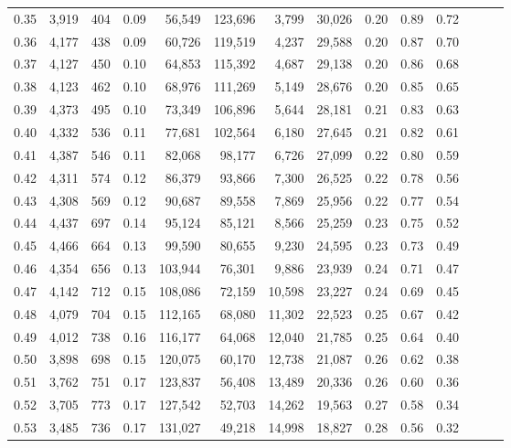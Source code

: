 \begin{tabular}{rrrrrrrrrrrrrr}
0.35 &  3,919 &  404 &  0.09 &   56,549 &  123,696 &   3,799 &  30,026 &  0.20 &  0.89 &      0.72 \\
0.36 &  4,177 &  438 &  0.09 &   60,726 &  119,519 &   4,237 &  29,588 &  0.20 &  0.87 &      0.70 \\
0.37 &  4,127 &  450 &  0.10 &   64,853 &  115,392 &   4,687 &  29,138 &  0.20 &  0.86 &      0.68 \\
0.38 &  4,123 &  462 &  0.10 &   68,976 &  111,269 &   5,149 &  28,676 &  0.20 &  0.85 &      0.65 \\
0.39 &  4,373 &  495 &  0.10 &   73,349 &  106,896 &   5,644 &  28,181 &  0.21 &  0.83 &      0.63 \\
0.40 &  4,332 &  536 &  0.11 &   77,681 &  102,564 &   6,180 &  27,645 &  0.21 &  0.82 &      0.61 \\
0.41 &  4,387 &  546 &  0.11 &   82,068 &   98,177 &   6,726 &  27,099 &  0.22 &  0.80 &      0.59 \\
0.42 &  4,311 &  574 &  0.12 &   86,379 &   93,866 &   7,300 &  26,525 &  0.22 &  0.78 &      0.56 \\
0.43 &  4,308 &  569 &  0.12 &   90,687 &   89,558 &   7,869 &  25,956 &  0.22 &  0.77 &      0.54 \\
0.44 &  4,437 &  697 &  0.14 &   95,124 &   85,121 &   8,566 &  25,259 &  0.23 &  0.75 &      0.52 \\
0.45 &  4,466 &  664 &  0.13 &   99,590 &   80,655 &   9,230 &  24,595 &  0.23 &  0.73 &      0.49 \\
0.46 &  4,354 &  656 &  0.13 &  103,944 &   76,301 &   9,886 &  23,939 &  0.24 &  0.71 &      0.47 \\
0.47 &  4,142 &  712 &  0.15 &  108,086 &   72,159 &  10,598 &  23,227 &  0.24 &  0.69 &      0.45 \\
0.48 &  4,079 &  704 &  0.15 &  112,165 &   68,080 &  11,302 &  22,523 &  0.25 &  0.67 &      0.42 \\
0.49 &  4,012 &  738 &  0.16 &  116,177 &   64,068 &  12,040 &  21,785 &  0.25 &  0.64 &      0.40 \\
0.50 &  3,898 &  698 &  0.15 &  120,075 &   60,170 &  12,738 &  21,087 &  0.26 &  0.62 &      0.38 \\
0.51 &  3,762 &  751 &  0.17 &  123,837 &   56,408 &  13,489 &  20,336 &  0.26 &  0.60 &      0.36 \\
0.52 &  3,705 &  773 &  0.17 &  127,542 &   52,703 &  14,262 &  19,563 &  0.27 &  0.58 &      0.34 \\
0.53 &  3,485 &  736 &  0.17 &  131,027 &   49,218 &  14,998 &  18,827 &  0.28 &  0.56 &      0.32 \\

\end{tabular}
